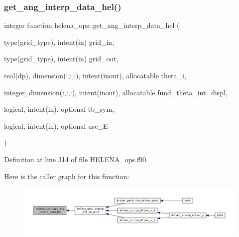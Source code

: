 \subsubsection{\texorpdfstring{get\+\_\+ang\+\_\+interp\+\_\+data\+\_\+hel()}{get\_ang\_interp\_data\_hel()}}
{\footnotesize\ttfamily integer function helena\+\_\+ops\+::get\+\_\+ang\+\_\+interp\+\_\+data\+\_\+hel (\begin{DoxyParamCaption}\item[{type(grid\+\_\+type), intent(in)}]{grid\+\_\+in,  }\item[{type(grid\+\_\+type), intent(in)}]{grid\+\_\+out,  }\item[{real(dp), dimension(\+:,\+:,\+:), intent(inout), allocatable}]{theta\+\_\+i,  }\item[{integer, dimension(\+:,\+:,\+:), intent(inout), allocatable}]{fund\+\_\+theta\+\_\+int\+\_\+displ,  }\item[{logical, intent(in), optional}]{tb\+\_\+sym,  }\item[{logical, intent(in), optional}]{use\+\_\+E }\end{DoxyParamCaption})}



Definition at line 314 of file H\+E\+L\+E\+N\+A\+\_\+ops.\+f90.

Here is the caller graph for this function\+:
\nopagebreak
\begin{figure}[H]
\begin{center}
\leavevmode
\includegraphics[width=350pt]{namespacehelena__ops_ab1329afe5af2ff92d96f4be15a096b38_icgraph}
\end{center}
\end{figure}
\mbox{\label{namespacehelena__ops_a7796861de18ae7ac9c3aa07a8628be38}} 
